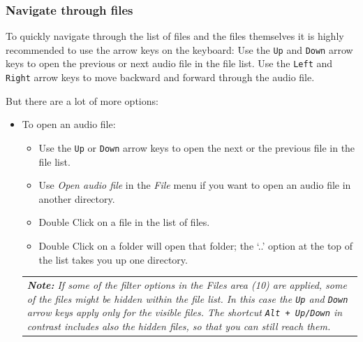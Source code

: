 \documentclass{scrartcl}
\begin{document}
\subsubsection{Navigate through files}
To quickly navigate through the list of files and the files themselves it is highly recommended to use the arrow keys on the keyboard:
Use the \texttt{Up} and \texttt{Down} arrow keys to open the previous or next audio file in the file list.
Use the \texttt{Left} and \texttt{Right} arrow keys to move backward and forward through the audio file.

But there are a lot of more options:
\begin{itemize}
	\item To open an audio file: 
	\begin{itemize}
		\item Use the \texttt{Up} or \texttt{Down} arrow keys to open the next or the previous file in the file list.
		\item Use \textit{Open audio file} in the \textit{File} menu if you want to open an audio file in another directory.
		\item Double Click on a file in the list of files.
		\item Double Click on a folder will open that folder; the `..' option at the top of the list takes you up one directory.
	\end{itemize}
	
	\begin{table}[h!]
		\centering
		\begin{tabular}{p{}}
			\textit{\textbf{Note:} If some of the filter options in the Files area (10) are applied, some of the files might be hidden within the file list. In this case the \texttt{Up} and \texttt{Down} arrow keys apply only for the visible files. The shortcut \texttt{Alt + Up/Down} in contrast includes also the hidden files, so that you can still reach them.}\\
		\end{tabular}
	\end{table}


\end{itemize}
\end{document}

